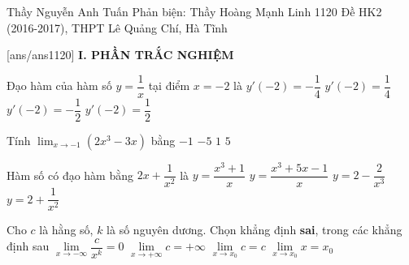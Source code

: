\begin{name}
{Thầy Nguyễn Anh Tuấn \newline Phản biện: Thầy Hoàng Mạnh Linh}
{1120 Đề HK2 (2016-2017), THPT Lê Quảng Chí, Hà Tĩnh}
	\end{name}
	\setcounter{ex}{0}\setcounter{bt}{0}
	[ans/ans1120]
\noindent\textbf{I. PHẦN TRẮC NGHIỆM}
\begin{ex}%
	Đạo hàm của hàm số $y=\dfrac{1}{x}$ tại điểm $x=-2$ là
	\choice
	{\True $y'\left(-2\right)=-\dfrac{1}{4}$}
	{$y'\left(-2\right)=\dfrac{1}{4}$}
	{$y'\left(-2\right)=-\dfrac{1}{2}$}
	{$y'\left(-2\right)=\dfrac{1}{2}$}
\end{ex}
\begin{ex}%
Tính $\displaystyle\lim_{x\to-1}\left(2x^3-3x\right)$ bằng
\choice
{$-1$}
{$-5$}
{\True $1$}
{$5$}
\end{ex}
\begin{ex}%
Hàm số có đạo hàm bằng $2x+\dfrac{1}{x^2}$ là
\choice
{$y=\dfrac{x^3+1}{x}$}
{\True $y=\dfrac{x^3+5x-1}{x}$}
{$y=2-\dfrac{2}{x^3}$}
{$y=2+\dfrac{1}{x^2}$}
\end{ex}
\begin{ex}%
Cho $c$ là hằng số, $k$ là số nguyên dương. Chọn khẳng định \textbf{sai}, trong các khẳng định sau
\choice
{$\underset{x\to-\infty}{\mathop{\lim}}\dfrac{c}{x^k}=0$}
{\True $\underset{x\to+\infty}{\mathop{\lim}}c=+\infty $}
{$\underset{x\to x_0}{\mathop{\lim}}c=c$}
{$\underset{x\to x_0}{\mathop{\lim}}x=x_0$}
\end{ex}
